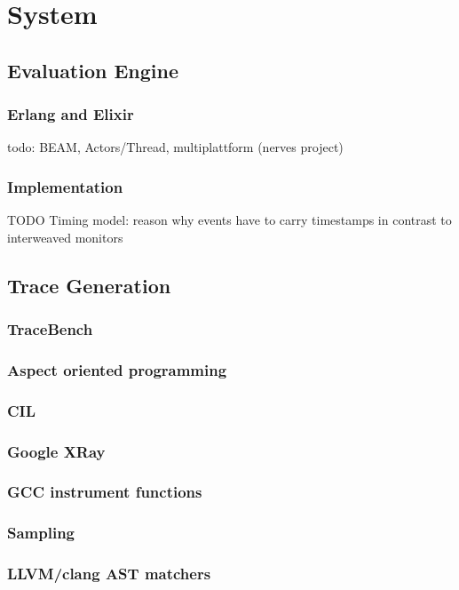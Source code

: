 %
\chapter{System}
\label{sec:system}

\section{Evaluation Engine}
\label{sec:system:eval_engine}

\subsection{Erlang and Elixir}
\label{sec:system:eval_engine:erlang_elixir}
todo: BEAM, Actors/Thread, multiplattform (nerves project)

\subsection{Implementation}
TODO\: Timing model: reason why events have to carry timestamps in contrast to interweaved monitors

\section{Trace Generation}
\label{sec:system:traces}

\subsection{TraceBench}
\subsection{Aspect oriented programming}
\subsection{CIL}
\subsection{Google XRay}
\subsection{GCC instrument functions}
\subsection{Sampling}
\subsection{LLVM/clang AST matchers}
